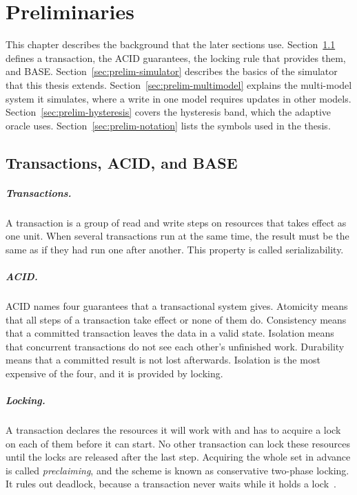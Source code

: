 
\chapter{Preliminaries}\label{chapter:preliminaries}

This chapter describes the background that the later sections use. Section~\ref{sec:prelim-transactions}
defines a transaction, the ACID guarantees, the locking rule that provides
them, and BASE.
Section~\ref{sec:prelim-simulator} describes the basics of the simulator that
this thesis extends. Section~\ref{sec:prelim-multimodel} explains the
multi-model system it simulates, where a write in one model requires updates in
other models. Section~\ref{sec:prelim-hysteresis} covers
the hysteresis band, which the adaptive oracle uses.
Section~\ref{sec:prelim-notation} lists the symbols used in the thesis.


\section{Transactions, ACID, and BASE}\label{sec:prelim-transactions}

\paragraph{Transactions.}\label{sec:prelim-serialisability}
A transaction is a group of read and write steps on resources that takes effect
as one unit. When several transactions run at the same time, the result must be the same as if
they had run one after another. This property is called serializability.

\paragraph{ACID.}\label{sec:prelim-acid}
ACID names four guarantees that a transactional system gives. Atomicity means
that all steps of a transaction take effect or none of them do. Consistency
means that a committed transaction leaves the data in a valid state. Isolation
means that concurrent transactions do not see each other's unfinished work.
Durability means that a committed result is not lost afterwards. Isolation is
the most expensive of the four, and it is provided by locking.


\paragraph{Locking.}\label{sec:prelim-2pl}
A transaction declares the resources it will work with and has to acquire a lock
on each of them before it can start. No other transaction can lock these
resources until the locks are released after the last step. Acquiring the whole
set in advance is called \emph{preclaiming}, and the scheme is known as
conservative two-phase locking. It rules out deadlock, because a transaction
never waits while it holds a lock~\cite{ries1979locking}.

